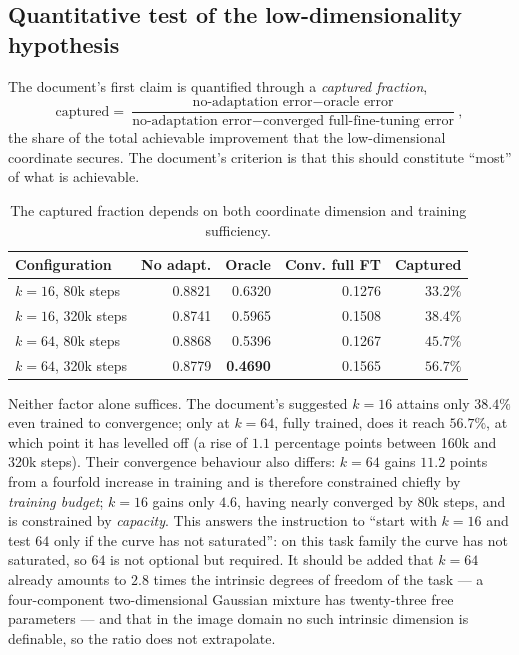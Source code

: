 \documentclass[11pt]{article}
\begin{document}
\subsection{Quantitative test of the low-dimensionality hypothesis}

The document's first claim is quantified through a \emph{captured fraction},
\begin{equation}
\mathrm{captured}
=\frac{\text{no-adaptation error}-\text{oracle error}}
       {\text{no-adaptation error}-\text{converged full-fine-tuning error}},
\end{equation}
the share of the total achievable improvement that the low-dimensional coordinate secures. The
document's criterion is that this should constitute ``most'' of what is achievable.

\begin{table}[htbp]
\centering\small
\begin{tabular}{@{}lrrrr@{}}
\toprule
\textbf{Configuration} & No adapt. & Oracle & Conv. full FT & \textbf{Captured} \\
\midrule
$k=16$, \phantom{0}80k steps & 0.8821 & 0.6320 & 0.1276 & $33.2\%$ \\
$k=16$, 320k steps           & 0.8741 & 0.5965 & 0.1508 & $38.4\%$ \\
$k=64$, \phantom{0}80k steps & 0.8868 & 0.5396 & 0.1267 & $45.7\%$ \\
$k=64$, 320k steps           & 0.8779 & \textbf{0.4690} & 0.1565 & $\mathbf{56.7\%}$ \\
\bottomrule
\end{tabular}
\caption{The captured fraction depends on both coordinate dimension and training sufficiency.}
\label{tab:captured}
\end{table}

Neither factor alone suffices. The document's suggested $k=16$ attains only $38.4\%$ even trained to
convergence; only at $k=64$, fully trained, does it reach $56.7\%$, at which point it has levelled
off (a rise of $1.1$ percentage points between 160k and 320k steps). Their convergence behaviour
also differs: $k=64$ gains $11.2$ points from a fourfold increase in training and is therefore
constrained chiefly by \emph{training budget}; $k=16$ gains only $4.6$, having nearly converged by
80k steps, and is constrained by \emph{capacity}. This answers the instruction to ``start with
$k=16$ and test $64$ only if the curve has not saturated'': on this task family the curve has not
saturated, so $64$ is not optional but required. It should be added that $k=64$ already amounts to
$2.8$ times the intrinsic degrees of freedom of the task --- a four-component two-dimensional
Gaussian mixture has twenty-three free parameters --- and that in the image domain no such intrinsic
dimension is definable, so the ratio does not extrapolate.
\end{document}
